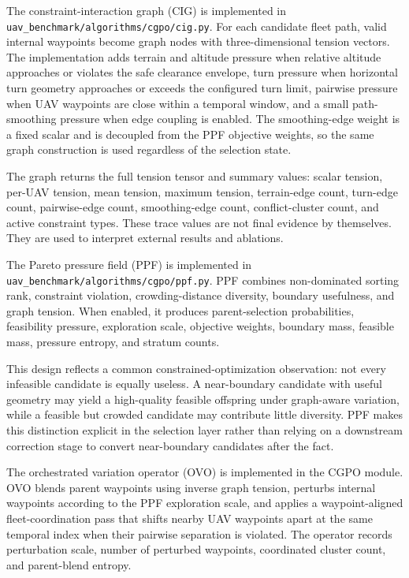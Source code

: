 \documentclass[a4paper,fleqn]{cas-dc}
\begin{document}
The constraint-interaction graph (CIG) is implemented in \texttt{uav\_benchmark/algorithms/cgpo/cig.py}. For each candidate fleet path, valid internal waypoints become graph nodes with three-dimensional tension vectors. The implementation adds terrain and altitude pressure when relative altitude approaches or violates the safe clearance envelope, turn pressure when horizontal turn geometry approaches or exceeds the configured turn limit, pairwise pressure when UAV waypoints are close within a temporal window, and a small path-smoothing pressure when edge coupling is enabled. The smoothing-edge weight is a fixed scalar and is decoupled from the PPF objective weights, so the same graph construction is used regardless of the selection state.

The graph returns the full tension tensor and summary values: scalar tension, per-UAV tension, mean tension, maximum tension, terrain-edge count, turn-edge count, pairwise-edge count, smoothing-edge count, conflict-cluster count, and active constraint types. These trace values are not final evidence by themselves. They are used to interpret external results and ablations.

The Pareto pressure field (PPF) is implemented in \texttt{uav\_benchmark/algorithms/cgpo/ppf.py}. PPF combines non-dominated sorting rank, constraint violation, crowding-distance diversity, boundary usefulness, and graph tension. When enabled, it produces parent-selection probabilities, feasibility pressure, exploration scale, objective weights, boundary mass, feasible mass, pressure entropy, and stratum counts.

This design reflects a common constrained-optimization observation: not every infeasible candidate is equally useless. A near-boundary candidate with useful geometry may yield a high-quality feasible offspring under graph-aware variation, while a feasible but crowded candidate may contribute little diversity. PPF makes this distinction explicit in the selection layer rather than relying on a downstream correction stage to convert near-boundary candidates after the fact.

The orchestrated variation operator (OVO) is implemented in the CGPO module. OVO blends parent waypoints using inverse graph tension, perturbs internal waypoints according to the PPF exploration scale, and applies a waypoint-aligned fleet-coordination pass that shifts nearby UAV waypoints apart at the same temporal index when their pairwise separation is violated. The operator records perturbation scale, number of perturbed waypoints, coordinated cluster count, and parent-blend entropy.
\end{document}
